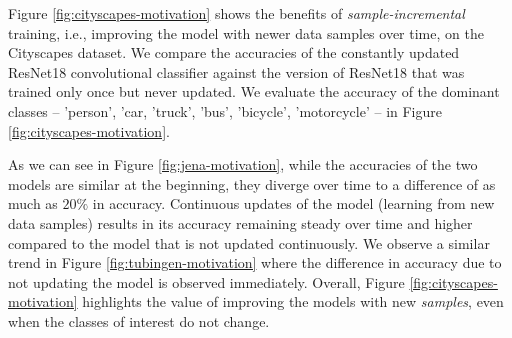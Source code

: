 Figure \ref{fig:cityscapes-motivation} shows the benefits of {\em sample-incremental} training, i.e., improving the model with newer data samples over time, on the Cityscapes dataset. %
We compare the accuracies of the constantly updated ResNet18 convolutional classifier against the version of ResNet18 that was trained only once  but never updated. We evaluate the accuracy of the dominant classes -- 'person', 'car, 'truck', 'bus', 'bicycle', 'motorcycle' -- in %
Figure \ref{fig:cityscapes-motivation}. 

As we can see in Figure \ref{fig:jena-motivation}, while the accuracies of the two models are similar at the beginning, they diverge over time to a difference of as much as $20\%$ in accuracy. Continuous updates of the model (learning from new data samples) results in its accuracy remaining steady over time and higher compared to the model that is not updated continuously. We observe a similar trend in Figure \ref{fig:tubingen-motivation} where the difference in accuracy due to not updating the model is observed immediately. Overall, Figure \ref{fig:cityscapes-motivation} highlights the value of improving the models with new {\em samples}, even when the classes of interest do not change.

